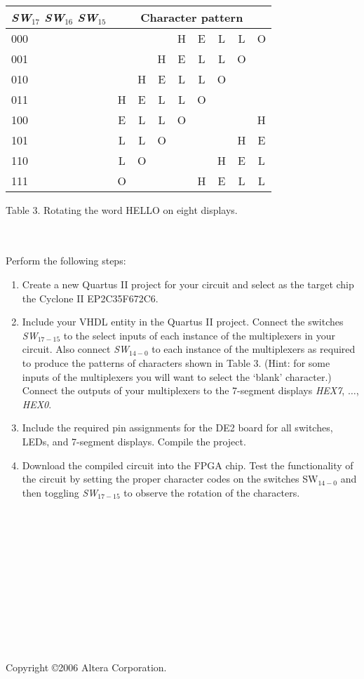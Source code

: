 \documentclass[psfig,10pt,fullpage]{article}
\begin{document}
~\\
\begin{center}
\begin{tabular}{l|cccccccc}
{\it SW}$_{17}$ {\it SW}$_{16}$ {\it SW}$_{15}$ & \multicolumn{8}{c}{Character pattern} \\
\hline
\hspace{8.0 mm} {\rule[0mm]{0mm}{5mm}000} &  &  &  & H & E & L & L & O\\ 
\hspace{8.0 mm} 001 &  &  & H & E & L & L & O & \\
\hspace{8.0 mm} 010 &  & H & E & L & L & O &  & \\
\hspace{8.0 mm} 011 & H & E & L & L & O &  &  & \\
\hspace{8.0 mm} 100 & E & L & L & O &  &  &  & H\\
\hspace{8.0 mm} 101 & L & L & O &  &  &  & H & E\\
\hspace{8.0 mm} 110 & L & O &  &  &  & H & E & L\\
\hspace{8.0 mm} 111 & O &  &  &  & H & E & L & L\\
\end{tabular}
\end{center}

\begin{center}
Table 3. Rotating the word HELLO on eight displays.
\end{center}
~\\
~\\

Perform the following steps:
\begin{enumerate}
\item Create a new Quartus II project for your circuit and select as the target chip the 
Cyclone II EP2C35F672C6.
\item Include your VHDL entity in the Quartus II project. Connect the switches 
{\it SW}$_{17-15}$ to the select inputs of each instance of the 
multiplexers in your circuit. Also connect {\it SW}$_{14-0}$ to each instance of the
multiplexers as required to produce the patterns of characters shown in Table 3. (Hint: for some
inputs of the multiplexers you will want to select the `blank' character.)
Connect the outputs of your multiplexers to the 7-segment displays {\it HEX7}, $\ldots$, 
{\it HEX0}.
\item Include the required pin assignments for the DE2 board for all switches, LEDs, 
and 7-segment displays. Compile the project.
\item Download the compiled circuit into the FPGA chip. Test the functionality of the 
circuit by setting the proper character codes on the switches SW$_{14-0}$ and then 
toggling {\it SW}$_{17-15}$ to observe the rotation of the characters.
\end{enumerate}

~\\
~\\
~\\
~\\
~\\
~\\
~\\
~\\
~\\
~\\
~\\
Copyright \copyright 2006 Altera Corporation. 
\end{document}
